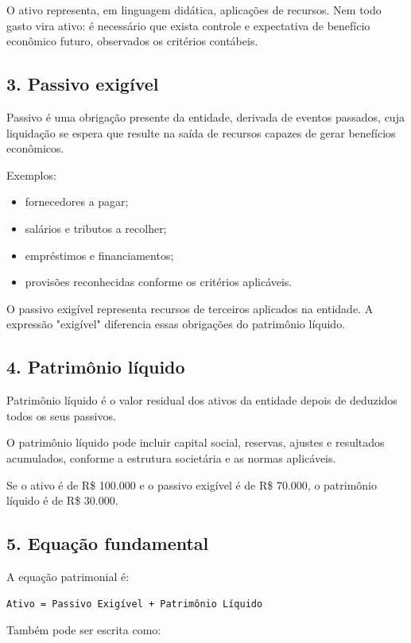 \documentclass[11pt,a4paper]{article}
\begin{document}
O ativo representa, em linguagem didática, aplicações de recursos. Nem todo gasto vira ativo: é necessário que exista controle e expectativa de benefício econômico futuro, observados os critérios contábeis.

\subsection*{3. Passivo exigível}

Passivo é uma obrigação presente da entidade, derivada de eventos passados, cuja liquidação se espera que resulte na saída de recursos capazes de gerar benefícios econômicos.

Exemplos:

\begin{itemize}
  \item fornecedores a pagar;
  \item salários e tributos a recolher;
  \item empréstimos e financiamentos;
  \item provisões reconhecidas conforme os critérios aplicáveis.
\end{itemize}

O passivo exigível representa recursos de terceiros aplicados na entidade. A expressão "exigível" diferencia essas obrigações do patrimônio líquido.

\subsection*{4. Patrimônio líquido}

Patrimônio líquido é o valor residual dos ativos da entidade depois de deduzidos todos os seus passivos.

O patrimônio líquido pode incluir capital social, reservas, ajustes e resultados acumulados, conforme a estrutura societária e as normas aplicáveis.

Se o ativo é de R\$ 100.000 e o passivo exigível é de R\$ 70.000, o patrimônio líquido é de R\$ 30.000.

\subsection*{5. Equação fundamental}

A equação patrimonial é:

\texttt{Ativo = Passivo Exigível + Patrimônio Líquido}

Também pode ser escrita como:
\end{document}
